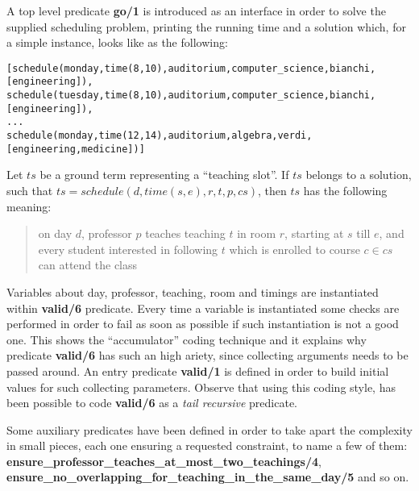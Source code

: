 \documentclass[10pt,a4paper]{article} %
\begin{document}
    A top level predicate \textbf{go/1} is introduced as an interface in order
    to solve the supplied scheduling problem, printing the running time and a
    solution which, for a simple instance, looks like as the following:
    \begin{verbatim}
[schedule(monday,time(8,10),auditorium,computer_science,bianchi,[engineering]),
schedule(tuesday,time(8,10),auditorium,computer_science,bianchi,[engineering]),
...
schedule(monday,time(12,14),auditorium,algebra,verdi,[engineering,medicine])]
    \end{verbatim}
    Let $ts$ be a ground term representing a ``teaching slot''. If $ts$ belongs to a
    solution, such that $ts = schedule(d, time(s,e), r, t, p, cs)$,
    then $ts$ has the following meaning:
    \begin{quote}
        on day $d$, professor $p$ teaches teaching $t$ in room $r$,
        starting at $s$ till $e$, and every student interested in following $t$
        which is enrolled to course $c \in cs$ can attend the class
    \end{quote}

    Variables about day, professor, teaching, room and timings
    are instantiated within \textbf{valid/6} predicate.
    Every time a variable is instantiated some
    checks are performed in order to fail as soon as possible if such
    instantiation is not a good one. This shows the ``accumulator''
    coding technique and it explains why predicate \textbf{valid/6} has
    such an high ariety, since collecting arguments needs to be passed around.
    An entry predicate \textbf{valid/1} is defined in order to build
    initial values for such collecting parameters.
    Observe that using this coding style, has been
    possible to code \textbf{valid/6} as a \emph{tail recursive} predicate.

    Some auxiliary predicates have been defined in order to take apart
    the complexity in small pieces, each one ensuring a requested constraint,
    to name a few of them: \textbf{ensure\_professor\_teaches\_at\_most\_two\_teachings/4},
    \textbf{ensure\_no\_overlapping\_for\_teaching\_in\_the\_same\_day/5} and so on.
\end{document}
